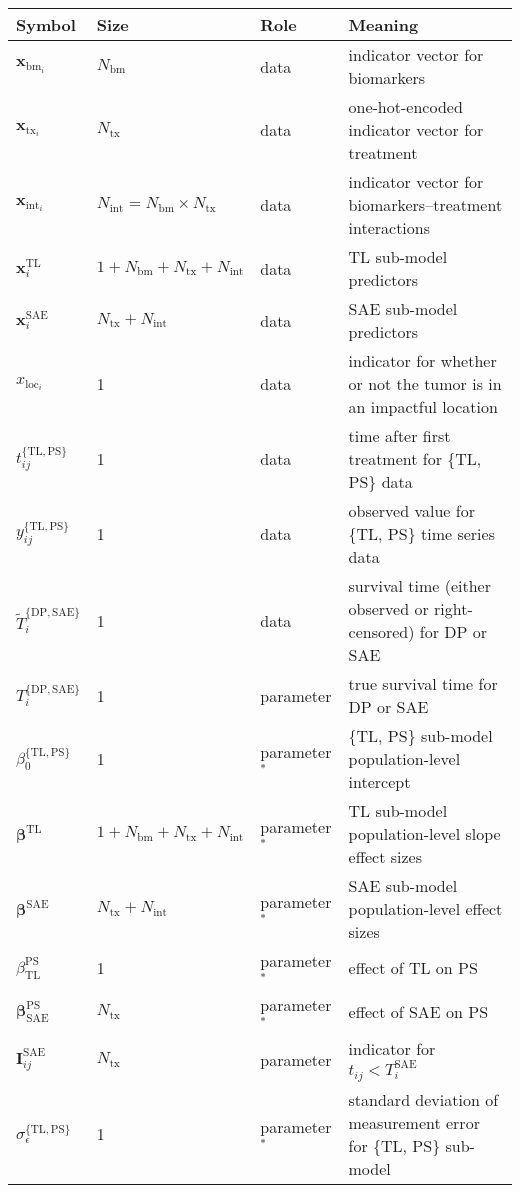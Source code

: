 \documentclass[twocolumn]{bmcart}%
\def\v#1{\bm{#1}}
\newcommand{\tl}{\ensuremath{\text{TL}}}
\newcommand{\ps}{\ensuremath{\text{PS}}}
\newcommand{\sae}{\ensuremath{\text{SAE}}}
\newcommand{\prog}{\ensuremath{\text{DP}}}
\begin{document}
\begin{table*}
  \centering
  \begin{tabular}{llll}
    \toprule
    Symbol & Size & Role & Meaning \\
    \midrule
    $\v x_{\text{bm}_i}$ & $N_\text{bm}$ & data & indicator vector for biomarkers \\[2pt]
    $\v x_{\text{tx}_i}$ & $N_\text{tx}$ & data & one-hot-encoded indicator vector for treatment \\[2pt]
    $\v x_{\text{int}_i}$ & $N_\text{int} = N_\text{bm} \times N_\text{tx}$ & data & indicator vector for biomarkers--treatment interactions \\[2pt]
    $\v x_i^\tl$ & $1 + N_\text{bm} + N_\text{tx} + N_\text{int}$ & data & TL sub-model predictors \\[2pt]
    $\v x_i^\sae$ & $N_\text{tx} + N_\text{int}$ & data & SAE sub-model predictors \\[2pt]
    $x_{\text{loc}_i}$ & 1 & data & indicator for whether or not the tumor is in an impactful location \\[2pt]
    $t_{ij}^{\{\tl,\ps\}}$ & 1 & data & time after first treatment for \{TL, PS\} data \\[2pt]
    $y_{ij}^{\{\tl,\ps\}}$ & 1 & data & observed value for \{TL, PS\} time series data \\[2pt]
    $\tilde{T}_{i}^{\{\prog,\sae\}}$ & 1 & data & survival time (either observed or right-censored) for DP or SAE \\[2pt]
    $T_{i}^{\{\prog,\sae\}}$ & 1 & parameter & true survival time for DP or SAE \\[2pt]
    
    $\beta_0^{\{\tl, \ps\}}$ & 1 & parameter$^*$ & \{TL, PS\} sub-model population-level intercept \\[2pt]
    $\v \beta^\tl$ & $1 + N_\text{bm} + N_\text{tx} + N_\text{int}$ & parameter$^*$ & TL sub-model population-level slope effect sizes \\[2pt]
    $\v \beta^\sae$ & $N_\text{tx} + N_\text{int}$ & parameter$^*$ & SAE sub-model population-level effect sizes \\[2pt]
    $\beta_\tl^\ps$ & 1 & parameter$^*$ & effect of TL on PS \\[2pt]
    $\v \beta_\sae^\ps$ & $N_\text{tx}$ & parameter$^*$ & effect of SAE on PS \\[2pt]
    $\v I_{ij}^\sae$ & $N_\text{tx}$ & parameter & indicator for $t_{ij} < T_i^\sae$ \\[2pt]
    $\sigma_\epsilon^{\{\tl, \ps\}}$ & 1 & parameter$^*$ & standard deviation of measurement error for \{TL, PS\} sub-model \\[2pt]
    

\end{tabular}
\end{table*}
\end{document}

